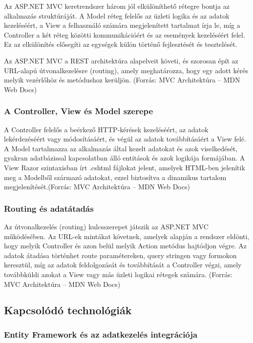 \indent Az ASP.NET MVC keretrendszer három jól elkülöníthető rétegre bontja az alkalmazás struktúráját. A Model réteg felelős az üzleti logika és az adatok kezeléséért, a View a felhasználó számára megjelenített tartalmat írja le, míg a Controller a két réteg közötti kommunikációért és az események kezeléséért felel. Ez az elkülönítés elősegíti az egységek külön történő fejlesztését és tesztelését.

Az ASP.NET MVC a REST architektúra alapelveit követi, és szorosan épít az URL-alapú útvonalkezelésre (routing), amely meghatározza, hogy egy adott kérés melyik vezérlőhöz és metódushoz kerüljön. (Forrás: MVC Architektúra – MDN Web Docs)

\subsubsection{A Controller, View és Model szerepe}

\indent A Controller felelős a beérkező HTTP-kérések kezeléséért, az adatok lekérdezéséért vagy módosításáért, és végül az adatok továbbításáért a View felé. A Model tartalmazza az alkalmazás által kezelt adatokat és azok viselkedését, gyakran adatbázissal kapcsolatban álló entitások és azok logikája formájában. A View Razor szintaxisban írt .cshtml fájlokat jelent, amelyek HTML-ben jelenítik meg a Modelből származó adatokat, ezzel biztosítva a dinamikus tartalom megjelenítését.(Forrás: MVC Architektúra – MDN Web Docs)

\subsubsection{Routing és adatátadás}

\indent Az útvonalkezelés (routing) kulcsszerepet játszik az ASP.NET MVC működésében. Az URL-ek mintákat követnek, amelyek alapján a rendszer eldönti, hogy melyik Controller és azon belül melyik Action metódus hajtódjon végre. Az adatok átadása történhet route paramétereken, query stringen vagy formokon keresztül, míg az adatok feldolgozását és továbbítását a Controller végzi, amely továbbküldi azokat a View vagy más üzleti logikai rétegek számára. (Forrás: MVC Architektúra – MDN Web Docs)


\subsection{Kapcsolódó technológiák}

\subsubsection{Entity Framework és az adatkezelés integrációja}

